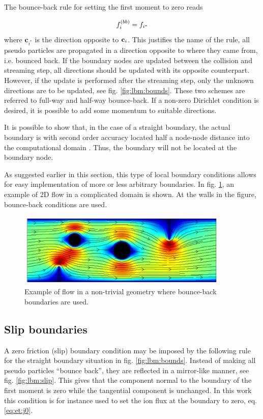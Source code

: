 The bounce-back rule for setting the first moment to zero reads

\begin{equation}
f_i^{(bb)} = f_{i^*}
\end{equation}
where $\mathbf{c}_{i^*}$ is the direction opposite to $\mathbf{c}_i$. This
justifies the name of the rule, all pseudo particles are propagated in
a direction opposite to where they came from, i.e. bounced back. If
the boundary nodes are updated between the collision and streaming
step, all directions should be updated with its opposite
counterpart. However, if the update is performed after the streaming
step, only the unknown directions are to be updated, see
fig. \ref{fig:lbm:bounds}. These two schemes are referred to full-way
and half-way bounce-back. If a non-zero Dirichlet condition is
desired, it is possible to add some momentum to suitable directions.

It is possible to show that, in the case of a straight boundary, the
actual boundary is with second order accuracy located half a node-node
distance into the computational domain \cite{junk-boundary}. Thus, the
boundary will not be located at the boundary node. 

As suggested earlier in this section, this type of local boundary
conditions allows for easy implementation of more or less arbitrary
boundaries. In fig. \ref{fig:lbm:cool_flow}, an example of 2D flow in a
complicated domain is shown. At the walls in the figure, bounce-back
conditions are used.

\begin{figure}
\begin{center}
\includegraphics[width=0.9\textwidth]{fig/comp_bound_u.pdf}
\end{center}
\caption{Example of flow in a non-trivial geometry where bounce-back
  boundaries are used.}
\label{fig:lbm:cool_flow}
\end{figure}

\subsection{Slip boundaries}\label{sec:lbm:mirror}
A zero friction (slip) boundary condition may be imposed by the
following rule for the straight boundary situation in
fig. \ref{fig:lbm:bounds}. Instead of making all pseudo particles
``bounce back'', they are reflected in a mirror-like manner, see
fig. \ref{fig:lbm:slip}. This gives that the component normal to the
boundary of the first moment is zero while the tangential component is
unchanged. In this work this condition is for instance used to set the
ion flux at the boundary to zero, eq. \eqref{eq:et:j0}.

